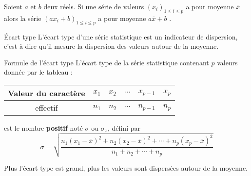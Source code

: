  
 
 
 
 
 

\begin{Th}
Soient $a$ et $b$ deux réels. Si une série de valeurs $(x_i)_{1 \leq i \leq p}$ a pour moyenne $\overline{x}$ alors la série $(ax_i + b)_{1 \leq i \leq p}$ a pour moyenne $a\overline{x}+b$ .
\end{Th} 
 
 
 
 
 
\begin{DefT}{Écart type}
L'écart type d'une série statistique est un indicateur de dispersion, c'est à dire qu'il mesure la dispersion des valeurs autour de la moyenne.
\end{DefT}
 
 

\begin{DefT}{Formule de l'écart type}
L'écart type de la série statistique contenant $p$ valeurs donnée par le tableau :

\begin{tabular}{|c|c|c|c|c|c|}
\hline 
Valeur du caractère & $x_1$ & $x_2$ & $\cdots$ & $x_{p-1}$ & $x_p$ \\ 
\hline 
effectif & $n_1$ & $n_2$ & $\cdots$ & $n_{p-1}$ & $n_p$ \\ 
\hline 
\end{tabular} 

est le nombre \textbf{positif} noté $\sigma$ ou $\sigma_x$, défini par  $$\sigma = \sqrt{\frac{n_1(x_1-\overline{x})^2 +n_2(x_2-\overline{x})^2 +\cdots+n_p(x_p-\overline{x})^2 }{n_1+n_2+\cdots+n_p}}$$
\end{DefT}

\begin{Rq}
Plus l'écart type est grand, plus les valeurs sont dispersées autour de la moyenne.
\end{Rq}

\begin{minipage}{0.48\linewidth}

\end{minipage}
\hfill
\begin{minipage}{0.48\linewidth}


\end{minipage}


